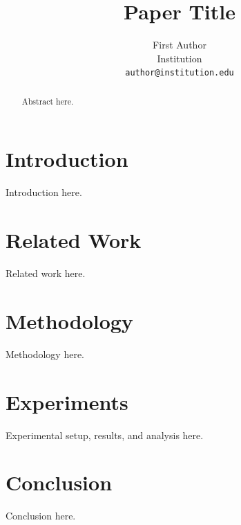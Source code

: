 \documentclass{article} %
\title{Paper Title}
\author{First Author\\
Institution\\
\texttt{author@institution.edu}
}
\begin{document}
\maketitle

\begin{abstract}
Abstract here.
\end{abstract}

\section{Introduction}
\label{sec:intro}
Introduction here.

\section{Related Work}
\label{sec:related_work}
Related work here.

\section{Methodology}
\label{sec:method}
Methodology here.

\section{Experiments}
\label{sec:experiments}
Experimental setup, results, and analysis here.

\section{Conclusion}
\label{sec:conclusion}
Conclusion here.




\end{document}
